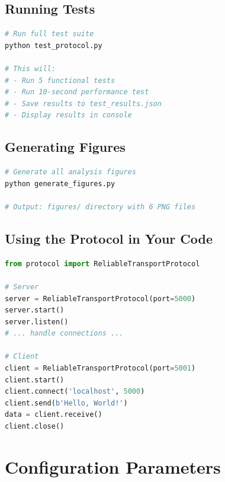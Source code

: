 \documentclass[11pt,a4paper]{article}
\begin{document}
\subsection{Running Tests}
\begin{lstlisting}[language=bash]
# Run full test suite
python test_protocol.py

# This will:
# - Run 5 functional tests
# - Run 10-second performance test
# - Save results to test_results.json
# - Display results in console
\end{lstlisting}

\subsection{Generating Figures}
\begin{lstlisting}[language=bash]
# Generate all analysis figures
python generate_figures.py

# Output: figures/ directory with 6 PNG files
\end{lstlisting}

\subsection{Using the Protocol in Your Code}
\begin{lstlisting}[language=Python]
from protocol import ReliableTransportProtocol

# Server
server = ReliableTransportProtocol(port=5000)
server.start()
server.listen()
# ... handle connections ...

# Client
client = ReliableTransportProtocol(port=5001)
client.start()
client.connect('localhost', 5000)
client.send(b'Hello, World!')
data = client.receive()
client.close()
\end{lstlisting}

\section{Configuration Parameters}
\end{document}
